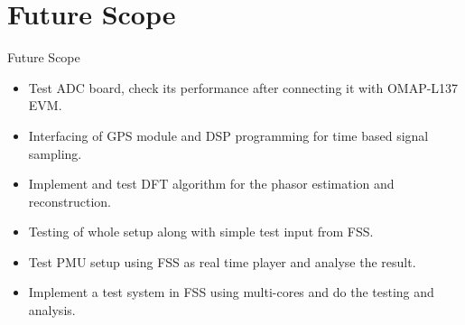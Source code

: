 \documentclass{beamer}
\begin{document}
\section{Future Scope}
\begin{frame}{Future Scope}
\begin{itemize}
\item Test ADC board, check its performance after connecting it with OMAP-L137 EVM.
\item Interfacing of GPS module and DSP programming for time based signal sampling.
\item Implement and test DFT algorithm for the phasor estimation and reconstruction.
\item Testing of whole setup along with simple test input from FSS.
\item Test PMU setup using FSS as real time player and analyse the result.
\item Implement a test system in FSS using multi-cores and do the testing and analysis.
\end{itemize}
\end{frame}
\end{document}
